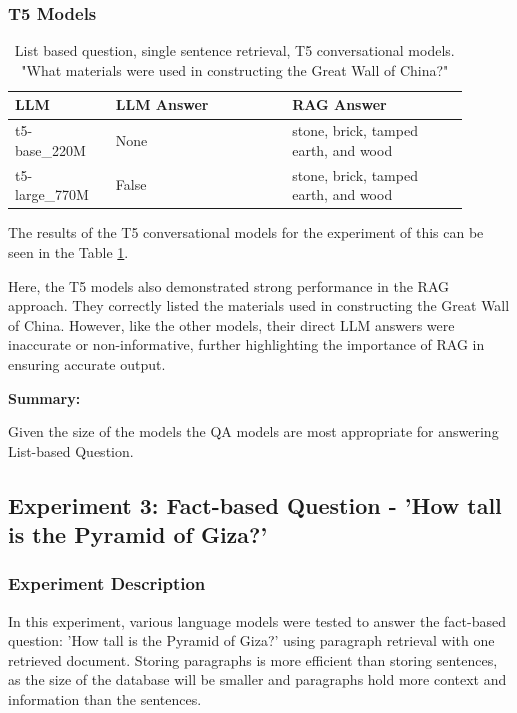 \documentclass{wseas}
\begin{document}
\subsubsection{T5 Models}

\begin{table}[htbp]
  \centering
  \caption{List based question, single sentence retrieval, T5 conversational models. "What materials were used in constructing the Great Wall of China?"} %
  \label{tab:experiment_Q_listBased_R_1Sentence_Q_listBased_M_T5Models_table} 
  \begin{tabular}{|p{0.20\linewidth}|p{0.35\linewidth}|p{0.35\linewidth}|}
    \hline
    \textbf{LLM} & \textbf{LLM Answer} & \textbf{RAG Answer} \\ \hline
    t5-base\_220M & None & stone, brick, tamped earth, and wood \\ \hline
    t5-large\_770M & False & stone, brick, tamped earth, and wood \\ \hline
  \end{tabular}
\end{table}

The results of the T5 conversational models for the experiment of this
can be seen in the Table \ref{tab:experiment_Q_listBased_R_1Sentence_Q_listBased_M_T5Models_table}.

Here, the T5 models also demonstrated strong performance in the RAG approach.
They correctly listed the materials used in constructing the Great Wall of
China. However, like the other models, their direct LLM answers were
inaccurate or non-informative, further highlighting the importance of
RAG in ensuring accurate output.

\textbf{Summary:}

Given the size of the models the QA models are most appropriate for
answering List-based Question.


\subsection{Experiment 3: Fact-based Question - 'How tall is the Pyramid of Giza?'}

\subsubsection{Experiment Description}

In this experiment, various language models were tested to answer the
fact-based question: 'How tall is the Pyramid of Giza?' using
paragraph retrieval with one retrieved document. Storing paragraphs is
more efficient than storing sentences, as the size of the database will
be smaller and paragraphs hold more context and information than the
sentences. 
\end{document}
